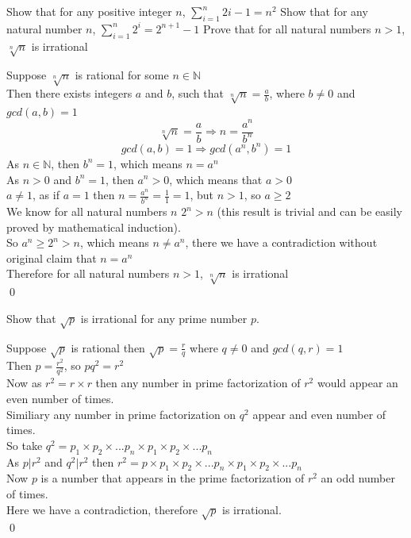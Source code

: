 \documentclass[12pt]{exam}
\begin{document}
\begin{questions}
    \question Show that for any positive integer $n$, $\sum\limits_{i = 1}^{n} 2i-1 = n^2$
    \question Show that for any natural number $n$, $\sum\limits_{i = 1}^{n} 2^i = 2^{n+1}-1$
    \question Prove that for all natural numbers $n>1$, $ \sqrt[n]{n}$ is irrational
    \begin{solution}
        Suppose $\sqrt[n]{n}$ is rational for some $n \in \mathbb{N}$
        \\Then there exists integers $a$ and $b$, such that $\sqrt[n]{n} = \frac{a}{b}$, where $b \neq 0$ and $gcd(a,b) =1$
        $$\sqrt[n]{n} = \frac{a}{b} \Rightarrow n = \frac{a^n}{b^n}$$
        $$gcd(a,b) =1 \Rightarrow gcd(a^n,b^n) =1$$
        As $n \in \mathbb{N}$, then $b^n = 1$, which means $n = a^n$
        \\As $n > 0$ and $b^n = 1$, then $a^n > 0$, which means that $a > 0$
        \\$a \neq 1$, as if $a = 1$ then $n = \frac{a^n}{b^n} = \frac{1}{1} = 1$, but $n > 1$, so $a \geq 2$
        \\We know for all natural numbers $n$ $2^n > n$ (this result is trivial and can be easily proved by mathematical induction).
        \\So $a^n \geq 2^n > n$, which means $n \neq a^n$, there we have a contradiction without original claim that $n = a^n$
        \\Therefore for all natural numbers $n>1$, $ \sqrt[n]{n}$ is irrational
        \\\qed
    \end{solution}

    \question Show that $\sqrt{p}$ is irrational for any prime number $p$.
    \begin{solution}
        Suppose $\sqrt{p}$ is rational then $\sqrt{p} = \frac{r}{q}$ where $q \neq 0$ and $gcd(q,r) = 1$
        \\Then $p = \frac{r^2}{q^2}$, so $pq^2 = r^2$
        \\Now as $r^2 = r \times r$ then any number in prime factorization of $r^2$ would appear an even number of times. 
        \\Similiary any number in prime factorization on $q^2$ appear and even number of times.
        \\So take $q^2 = p_1 \times p_2 \times... p_n \times p_1 \times p_2 \times... p_n$
        \\As $p|r^2$ and $q^2|r^2$ then $r^2 = p \times p_1 \times p_2 \times... p_n \times p_1 \times p_2 \times... p_n$
        \\Now $p$ is a number that appears in the prime factorization of $r^2$ an odd number of times.
        \\Here we have a contradiction, therefore $\sqrt{p}$ is irrational.
        \\\qed
    \end{solution}


\end{questions}
\end{document}
